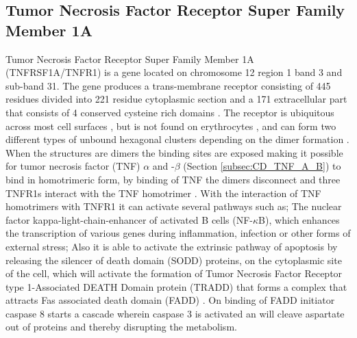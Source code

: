 \subsection{Tumor Necrosis Factor Receptor Super Family Member 1A}
Tumor Necrosis Factor Receptor Super Family Member 1A (TNFRSF1A/TNFR1) is a gene located on chromosome 12 region 1 band 3 and sub-band 31. The gene produces a trans-membrane receptor consisting of 445 residues divided into 221 residue cytoplasmic section and a 171 extracellular part that consists of 4 conserved cysteine rich domains \cite{gray_cloning_1990,walter_encyclopedia_2007,banner_crystal_1993}.
The receptor is ubiquitous across most cell surfaces , but is not found on erythrocytes \cite{segueni_innate_2016}, and can form two different types of unbound hexagonal clusters depending on the dimer formation \cite{naismith_crystallographic_1995}. 
When the structures are dimers the binding sites are exposed making it possible for tumor necrosis factor (TNF) $\alpha$ and -$\beta$  (Section \ref{subsec:CD_TNF_A_B}) to bind in homotrimeric form, by binding of TNF the dimers disconnect and three TNFR1s interact with the TNF homotrimer \cite{naismith_crystallographic_1995}.
With the interaction of TNF homotrimers with TNFR1 it can activate several pathways such as; The nuclear factor kappa-light-chain-enhancer of activated B cells (NF-$\kappa$B), which enhances the transcription of various genes during inflammation, infection or other forms of external stress; Also it is able to activate the extrinsic pathway of apoptosis by releasing the silencer of death domain (SODD) proteins, on the cytoplasmic site of the cell, which will activate the formation of Tumor Necrosis Factor Receptor type 1-Associated DEATH Domain protein (TRADD) \cite{bender_adaptor_2005}
 that forms a complex that attracts Fas associated death domain (FADD) \cite{muppidi_life_2004}. 
On binding of FADD initiator caspase 8  starts a cascade wherein caspase 3 is activated an will cleave aspartate out of proteins and thereby disrupting the metabolism\cite{vinay_robbins_2014,chen_tnf-r1_2002,hengartner_biochemistry_2000}.
\label{subsec:CD_TNFRSF1A}

